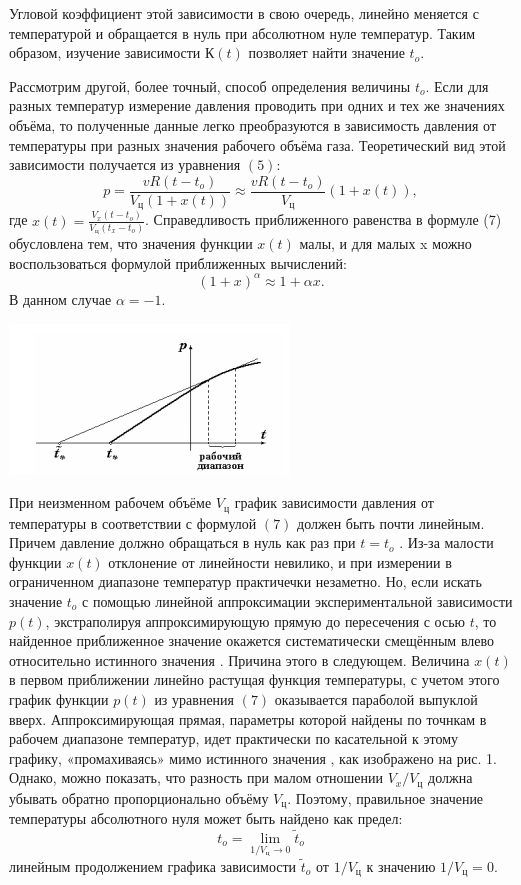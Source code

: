 \documentclass[12pt]{article}
\begin{document}
Угловой коэффициент этой зависимости в свою очередь, линейно меняется с температурой и обращается в нуль при абсолютном нуле температур. Таким образом, изучение зависимости $К(t)$ позволяет найти значение $t_{o}$.

Рассмотрим другой, более точный, способ определения величины $t_{o}$. Если для разных температур измерение давления проводить при одних и тех же значениях объёма, то полученные данные легко преобразуются в зависимость давления от температуры при разных значения рабочего объёма газа. Теоретический вид этой зависимости получается из уравнения $(5)$:
\begin{equation}
p=\frac{vR(t-t_{o})}{V_{ц}(1+x(t))}\approx \frac{vR(t-t_{o})}{V_{ц}}(1+x(t)),
\end{equation}
где $x(t)=\frac{V_{x} (t-t_{o})}{V_{ц} (t_{x}-t_{o} ) }$. Справедливость приближенного равенства в формуле (7) обусловлена тем, что значения функции $x(t)$  малы, и для малых x можно воспользоваться формулой приближенных вычислений:
\begin{equation}
(1+x)^{\alpha} \approx 1 + \alpha x.
\end{equation}
В данном случае $\alpha = -1$.

\begin{center}
\includegraphics{2}
\end{center}
При неизменном рабочем объёме $V_{ц}$ график зависимости давления от температуры в соответствии с формулой $(7)$ должен быть почти линейным. Причем давление должно обращаться в нуль как раз при $t = t_{o}$ . Из-за малости функции $x(t)$ отклонение от линейности невилико, и при измерении в ограниченном диапазоне температур практичечки незаметно. Но, если искать значение  $t_{o}$  с помощью линейной аппроксимации экспериментальной зависимости $p(t)$, экстраполируя аппроксимирующую прямую до пересечения с осью $t$, то найденное приближенное значение   окажется систематически смещённым влево относительно истинного значения   . Причина этого в следующем. Величина $x(t)$ в первом приближении линейно растущая функция температуры, с учетом этого график функции $p(t)$ из уравнения $(7)$ оказывается параболой выпуклой вверх. Аппроксимирующая прямая, параметры которой найдены по точнкам в рабочем диапазоне температур, идет практически по касательной к этому графику, «промахиваясь» мимо истинного значения  , как изображено на рис. 1. Однако, можно показать, что разность  при малом отношении $V_{x}/V_{ц}$  должна убывать обратно пропорционально объёму $V_{ц}$. Поэтому, правильное значение температуры абсолютного нуля может быть найдено как предел:
\begin{equation}
t_{o} = \lim_{1/V_{ц}\to 0}\widetilde{t}_{o}
\end{equation}
линейным продолжением графика зависимости  $\widetilde{t}_{o}$ от $1/V_{ц}$ к значению $1/V_{ц} =0$.
\end{document}
